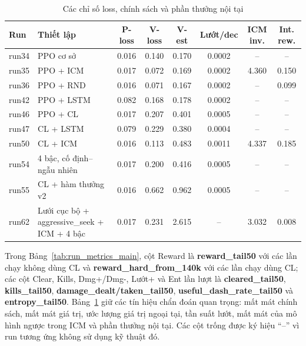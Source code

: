 \begin{table}[H]
    \centering
    \scriptsize
    \setlength{\tabcolsep}{5pt}
    \renewcommand{\arraystretch}{1.15}
    \caption{Các chỉ số loss, chính sách và phần thưởng nội tại}
    \label{tab:run_metrics_aux}
    \begin{tabular}{l p{3.5cm} c c c c c c}
        \toprule
        \textbf{Run} & \textbf{Thiết lập} & \textbf{P-loss} & \textbf{V-loss} & \textbf{V-est} & \textbf{Lướt/dec} & \textbf{ICM inv.} & \textbf{Int. rew.} \\
        \midrule
        run34 & PPO cơ sở & 0.016 & 0.140 & 0.170 & 0.0002 & -- & -- \\
        run35 & PPO + ICM & 0.017 & 0.072 & 0.169 & 0.0002 & 4.360 & 0.150 \\
        run36 & PPO + RND & 0.016 & 0.071 & 0.167 & 0.0002 & -- & 0.099 \\
        run42 & PPO + LSTM & 0.082 & 0.168 & 0.178 & 0.0002 & -- & -- \\
        run46 & PPO + CL & 0.017 & 0.207 & 0.401 & 0.0005 & -- & -- \\
        run47 & CL + LSTM & 0.079 & 0.229 & 0.380 & 0.0004 & -- & -- \\
        run50 & CL + ICM & 0.016 & 0.113 & 0.483 & 0.0011 & 4.337 & 0.185 \\
        run54 & 4 bậc, cố định--ngẫu nhiên & 0.017 & 0.200 & 0.416 & 0.0005 & -- & -- \\
        run55 & CL + hàm thưởng v2 & 0.016 & 0.662 & 0.962 & 0.0005 & -- & -- \\
        run62 & Lưới cục bộ + aggressive\_seek + ICM + 4 bậc & 0.017 & 0.231 & 2.615 & -- & 3.032 & 0.008 \\
        \bottomrule
    \end{tabular}
\end{table}

Trong Bảng~\ref{tab:run_metrics_main}, cột Reward là \textbf{reward\_tail50} với các lần chạy không dùng CL và \textbf{reward\_hard\_from\_140k} với các lần chạy dùng CL; các cột Clear, Kills, Dmg+/Dmg-, Lướt+ và Ent lần lượt là \textbf{cleared\_tail50}, \textbf{kills\_tail50}, \textbf{damage\_dealt/taken\_tail50}, \textbf{useful\_dash\_rate\_tail50} và \textbf{entropy\_tail50}. Bảng~\ref{tab:run_metrics_aux} giữ các tín hiệu chẩn đoán quan trọng: mất mát chính sách, mất mát giá trị, ước lượng giá trị ngoại tại, tần suất lướt, mất mát của mô hình ngược trong ICM và phần thưởng nội tại. Các cột trống được ký hiệu ``--'' vì run tương ứng không sử dụng kỹ thuật đó.

